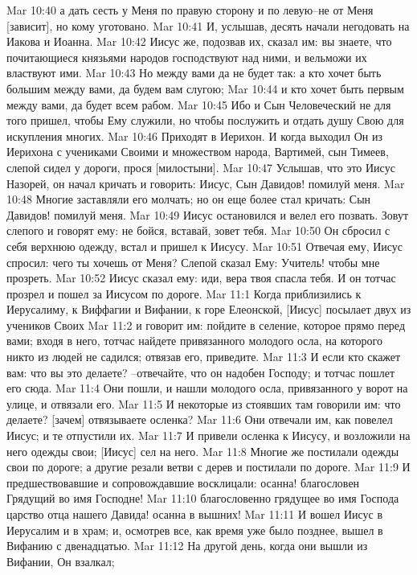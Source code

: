 Mar 10:40  а дать сесть у Меня по правую сторону и по левую--не от Меня [зависит], но кому уготовано.
Mar 10:41  И, услышав, десять начали негодовать на Иакова и Иоанна.
Mar 10:42  Иисус же, подозвав их, сказал им: вы знаете, что почитающиеся князьями народов господствуют над ними, и вельможи их властвуют ими.
Mar 10:43  Но между вами да не будет так: а кто хочет быть большим между вами, да будем вам слугою;
Mar 10:44  и кто хочет быть первым между вами, да будет всем рабом.
Mar 10:45  Ибо и Сын Человеческий не для того пришел, чтобы Ему служили, но чтобы послужить и отдать душу Свою для искупления многих.
Mar 10:46  Приходят в Иерихон. И когда выходил Он из Иерихона с учениками Своими и множеством народа, Вартимей, сын Тимеев, слепой сидел у дороги, прося [милостыни].
Mar 10:47  Услышав, что это Иисус Назорей, он начал кричать и говорить: Иисус, Сын Давидов! помилуй меня.
Mar 10:48  Многие заставляли его молчать; но он еще более стал кричать: Сын Давидов! помилуй меня.
Mar 10:49  Иисус остановился и велел его позвать. Зовут слепого и говорят ему: не бойся, вставай, зовет тебя.
Mar 10:50  Он сбросил с себя верхнюю одежду, встал и пришел к Иисусу.
Mar 10:51  Отвечая ему, Иисус спросил: чего ты хочешь от Меня? Слепой сказал Ему: Учитель! чтобы мне прозреть.
Mar 10:52  Иисус сказал ему: иди, вера твоя спасла тебя. И он тотчас прозрел и пошел за Иисусом по дороге.
Mar 11:1  Когда приблизились к Иерусалиму, к Виффагии и Вифании, к горе Елеонской, [Иисус] посылает двух из учеников Своих
Mar 11:2  и говорит им: пойдите в селение, которое прямо перед вами; входя в него, тотчас найдете привязанного молодого осла, на которого никто из людей не садился; отвязав его, приведите.
Mar 11:3  И если кто скажет вам: что вы это делаете? --отвечайте, что он надобен Господу; и тотчас пошлет его сюда.
Mar 11:4  Они пошли, и нашли молодого осла, привязанного у ворот на улице, и отвязали его.
Mar 11:5  И некоторые из стоявших там говорили им: что делаете? [зачем] отвязываете осленка?
Mar 11:6  Они отвечали им, как повелел Иисус; и те отпустили их.
Mar 11:7  И привели осленка к Иисусу, и возложили на него одежды свои; [Иисус] сел на него.
Mar 11:8  Многие же постилали одежды свои по дороге; а другие резали ветви с дерев и постилали по дороге.
Mar 11:9  И предшествовавшие и сопровождавшие восклицали: осанна! благословен Грядущий во имя Господне!
Mar 11:10  благословенно грядущее во имя Господа царство отца нашего Давида! осанна в вышних!
Mar 11:11  И вошел Иисус в Иерусалим и в храм; и, осмотрев все, как время уже было позднее, вышел в Вифанию с двенадцатью.
Mar 11:12  На другой день, когда они вышли из Вифании, Он взалкал;
